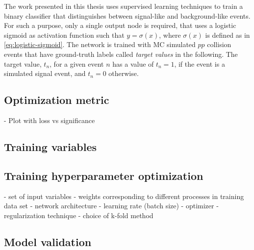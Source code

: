 The work presented in this thesis uses supervised learning techniques to train a binary classifier that distinguishes between signal-like and background-like events. 
For such a purpose, only a single output node is required, that uses a logistic sigmoid as activation function such that $y = \sigma(x)$, where $\sigma(x)$ is defined as in \cref{eq:logistic-sigmoid}.
The network is trained with MC simulated $pp$ collision events that have ground-truth labels called \emph{target values} in the following. The target value, $t_n$, for a given event $n$ has a value of $t_n = 1$, if the event is a simulated signal event, and $t_n = 0$ otherwise.

\subsection{Optimization metric}
- Plot with loss vs significance

\subsection{Training variables}


\subsection{Training hyperparameter optimization}

- set of input variables
- weights corresponding to different processes in training data set
- network architecture
- learning rate (batch size)
- optimizer
- regularization technique
- choice of k-fold method
\subsection{Model validation}
